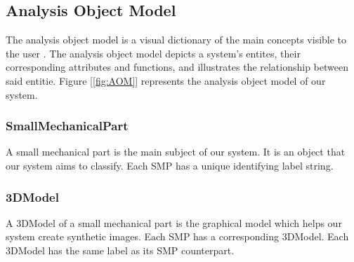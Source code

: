 \begin{usecase}




\end{usecase}

\clearpage
\subsection{Analysis Object Model}

The analysis object model is a visual dictionary of the main concepts visible to the user \cite{bruegge2004object}. The analysis object model depicts a system's entites, their corresponding attributes and functions, and illustrates the relationship between said entitie. Figure [\ref{fig:AOM}] represents the analysis object model of our system.

\subsubsection{SmallMechanicalPart}
A small mechanical part is the main subject of our system. It is an object that our system aims to classify. Each SMP has a unique identifying label string.

\subsubsection{3DModel}
A 3DModel of a small mechanical part is the graphical model which helps our system create synthetic images. Each SMP has a corresponding 3DModel. Each 3DModel has the same label as its SMP counterpart.

